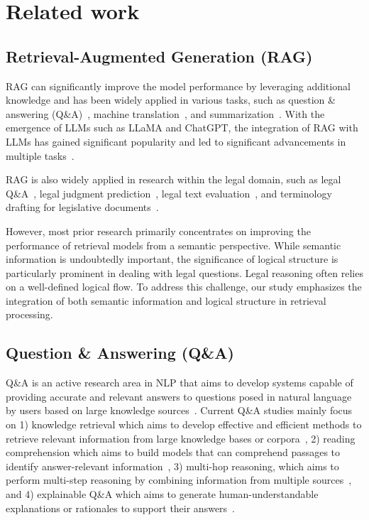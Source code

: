 \section{Related work}
\subsection{Retrieval-Augmented Generation (RAG)}

RAG can significantly improve the model performance by leveraging additional knowledge and has been widely applied in various tasks, such as question \& answering (Q\&A)~\citep{lewis2020retrieval, mao2020generation}, machine
translation~\citep{gu2018search}, and summarization~\citep{liu2020retrieval, parvez2021retrieval}. With the emergence of LLMs such as LLaMA and ChatGPT, the integration of RAG with LLMs has gained significant popularity and led to significant advancements in multiple tasks~\citep{liu2023reta, kim2023tree, sharma2024retrieval, feng2024retrieval}.


RAG is also widely applied in research within the legal domain, such as legal Q\&A~\citep{cui2023chatlaw, louis2024interpretable, wiratunga2024cbr}, legal judgment prediction~\citep{wu2023precedent}, legal text evaluation~\citep{ryu2023retrieval}, and terminology drafting for legislative documents~\citep{chouhan2024lexdrafter}. 

However, most prior research primarily concentrates on improving the performance of retrieval models from a semantic perspective. While semantic information is undoubtedly important, the significance of logical structure is particularly prominent in dealing with legal questions. Legal reasoning often relies on a well-defined logical flow. To address this challenge, our study emphasizes the integration of both semantic information and logical structure in retrieval processing.


\subsection{Question \& Answering (Q\&A)}
Q\&A is an active research area in NLP that aims to develop systems capable of providing accurate and relevant answers to questions posed in natural language by users based on large knowledge sources~\citep{Rogers2023}. Current Q\&A studies mainly focus on 1) knowledge retrieval which aims to develop effective and efficient methods to retrieve relevant information from large knowledge bases or corpora~\citep{Vladimir2020}, 2) reading comprehension which aims to build models that can comprehend passages to identify answer-relevant information~\citep{Baradaran2022}, 3) multi-hop reasoning, which aims to perform multi-step reasoning by combining information from multiple sources~\citep{wang-etal-2022-new}, and 4) explainable Q\&A which aims to generate human-understandable explanations or rationales to support their answers~\citep{Veronica2020}.


